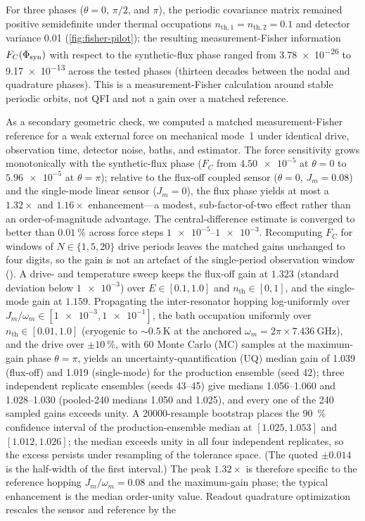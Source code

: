 \documentclass[preprint,numbers,a4paper]{elsarticle}
\begin{document}
For three phases ($\theta=0$, $\pi/2$, and $\pi$), the periodic covariance matrix remained positive semidefinite under thermal occupations $n_{\mathrm{th},1}=n_{\mathrm{th},2}=\num{0.1}$ and detector variance \num{0.01} (\cref{fig:fisher-pilot}); the resulting measurement-Fisher information $F_C(\Phi_{\rm syn})$ with respect to the synthetic-flux phase ranged from \num{3.78e-26} to \num{9.17e-13} across the tested phases (thirteen decades between the nodal and quadrature phases). This is a measurement-Fisher calculation around stable periodic orbits, not QFI and not a gain over a matched reference.

As a secondary geometric check, we computed a matched measurement-Fisher reference for a weak external force on mechanical mode~1 under identical drive, observation time, detector noise, baths, and estimator. The force sensitivity grows monotonically with the synthetic-flux phase ($F_C$ from $\num{4.50e-5}$ at $\theta=0$ to $\num{5.96e-5}$ at $\theta=\pi$); relative to the flux-off coupled sensor ($\theta=0$, $J_m=\num{0.08}$) and the single-mode linear sensor ($J_m=0$), the flux phase yields at most a $\num{1.32}\times$ and $\num{1.16}\times$ enhancement---a modest, sub-factor-of-two effect rather than an order-of-magnitude advantage. The central-difference estimate is converged to better than $\qty{0.01}{\percent}$ across force steps $\num{1e-5}$--$\num{1e-3}$. Recomputing $F_C$ for windows of $N\in\{1,5,20\}$ drive periods leaves the matched gains unchanged to four digits, so the gain is not an artefact of the single-period observation window (). A drive- and temperature sweep keeps the flux-off gain at $\num{1.323}$ (standard deviation below $\num{1e-3}$) over $E\in[\num{0.1},\num{1.0}]$ and $n_{\mathrm{th}}\in[0,1]$, and the single-mode gain at $\num{1.159}$. Propagating the inter-resonator hopping log-uniformly over $J_m/\omega_m\in[\num{1e-3},\num{1e-1}]$, the bath occupation uniformly over $n_{\mathrm{th}}\in[\num{0.01},\num{1.0}]$ (cryogenic to $\sim\num{0.5}~\si{\kelvin}$ at the anchored $\omega_m=2\pi\times\num{7.436}~\si{\giga\hertz}$), and the drive over $\pm\qty{10}{\percent}$, with \num{60} Monte Carlo (MC) samples at the maximum-gain phase $\theta=\pi$, yields an uncertainty-quantification (UQ) median gain of \num{1.039} (flux-off) and \num{1.019} (single-mode) for the production ensemble (seed \num{42}); three independent replicate ensembles (seeds \num{43}--\num{45}) give medians \num{1.056}--\num{1.060} and \num{1.028}--\num{1.030} (pooled-\num{240} medians \num{1.050} and \num{1.025}), and every one of the \num{240} sampled gains exceeds unity. A \num{20000}-resample bootstrap places the \qty{90}{\percent} confidence interval of the production-ensemble median at $[\num{1.025},\num{1.053}]$ and $[\num{1.012},\num{1.026}]$; the median exceeds unity in all four independent replicates, so the excess persists under resampling of the tolerance space. (The quoted $\pm\num{0.014}$ is the half-width of the first interval.) The peak $\num{1.32}\times$ is therefore specific to the reference hopping $J_m/\omega_m=\num{0.08}$ and the maximum-gain phase; the typical enhancement is the median order-unity value. Readout quadrature optimization rescales the sensor and reference by the 
\end{document}
